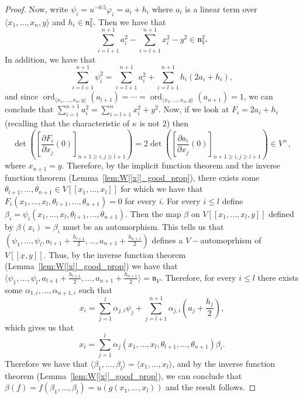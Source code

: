 \documentclass{article}
\DeclareMathOperator{\ord}{ord}
\newcommand{\naxV}{\mathfrak{n}_V}
\numberwithin{theorem}{section}
\begin{document}
\begin{proof}
    \noindent Now,  write $\psi_i = u^{-0.5} \varphi_i = a_i + h_i$ where $a_i$ is a linear term over $\langle x_1, \dots, x_n,y \rangle$ and $h_i \in \naxV^2$. Then  we have that $$\sum_{i=l+1}^{n+1} a_i^2 - \sum_{i=l+1}^{n+1} x_i^2 - y^2 \in \naxV^2.$$ In addition, we have that 
    \begin{equation*}
        \sum_{i=l+1}^{n+1} \psi_i^2 = \sum_{i=l+1}^{n+1} a_i^2 + \sum_{i=l+1}^{n+1} h_i(2a_i+h_i),
    \end{equation*}
    and since $\ord_{\langle x_1, \dots, x_n,y \rangle}(a_{l+1}) =  \cdots =\ord_{\langle x_1, \dots, x_n,y \rangle}(a_{n+1})=1$,  we can conclude that $\sum_{i=1}^{n+1} a_i^2 = \sum_{i=l+1}^{n} x_i^2 +y^2$. Now, if we look at $F_i = 2a_i + h_i $ (recalling that the characteristic of $\kappa$ is not $2$) then  
    \begin{equation*}
        \det\left( \left[\frac{\partial F_i}{\partial x_j} \left(0\right)\right]_{n+1 \geq i,j \geq l+1}\right) =2\det\left( \left[\frac{\partial a_i}{\partial x_j} \left(0\right)\right]_{n+1 \geq i,j \geq l+1}\right) \in V^{\times},
    \end{equation*}
    \noindent where $x_{n+1}=y$. Therefore, by the implicit function theorem and the inverse function theorem (Lemma~\ref{lem:W[[x]]_good_prop}), there exists some $\theta_{l+1}, \dots, \theta_{n+1} \in V[[x_1, \dots, x_l]]$ for which we have that $F_i\left(x_1, \dots, x_l, \theta_{l+1}, \dots, \theta_{n+1}\right)=0$ for every $i$. For every $i \leq l$ define  $\beta_i = \psi_i\left(x_1, \dots, x_l, \theta_{l+1}, \dots, \theta_{n+1}\right)$. Then the map $\beta$ on $V[[x_1, \dots, x_l,y]]$ defined by $\beta\left(x_i\right)=\beta_i$ must be an automorphism. This tells us that $\left(\psi_1, \dots, \psi_l, a_{l+1}+\frac{h_{l+1}}{2}, \dots,  a_{n+1}+\frac{h_{n+1}}{2} \right)$ defines a $V-$automoprhism of $V[[\underline{x},y]]$. Thus, by the inverse function theorem (Lemma~\ref{lem:W[[x]]_good_prop}) we have that $\langle \psi_1, \dots, \psi_l, a_{l+1}+\frac{h_{l+1}}{2}, \dots,  a_{n+1}+\frac{h_{n+1}}{2} \rangle = \naxV$. Therefore, for every $i \leq l$ there exists some $\alpha_{1,i}, \dots,\alpha_{n+1,i}$ such that 
    \begin{equation*}
        x_i = \sum_{j=1}^l \alpha_{j,i} \psi_j + \sum_{j=l+1}^{n+1} \alpha_{j,i} \left(a_{j}+\frac{h_{j}}{2}\right), 
    \end{equation*}
    which gives us that 
    \begin{equation*}
        x_i=\sum_{j=1}^l \alpha_j\left(x_1, \dots, x_l, \theta_{l+1}, \dots, \theta_{n+1}\right) \beta_i. 
    \end{equation*}
    Therefore we have that $\langle \beta_1, \dots, \beta_l \rangle = \langle x_1, \dots, x_l \rangle$, and by the inverse function theorem (Lemma~\ref{lem:W[[x]]_good_prop}), we can conclude that $\beta(f)=f\left(\beta_1, \dots, \beta_l\right)= u\left(g\left(x_1, \dots, x_l\right)\right)$ and the result follows.
\end{proof}
\end{document}
